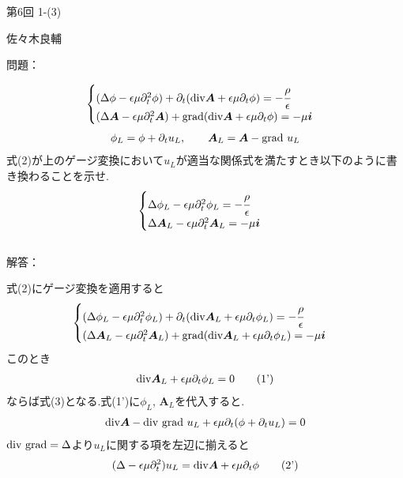 \documentclass[uplatex,a4j,11pt]{jsarticle}
\begin{document}
第6回 1-(3)
\begin{flushright}
  佐々木良輔
\end{flushright}
問題：\par
\setcounter{equation}{1}
\begin{align}
  \begin{cases}
    (\Delta\phi-\epsilon\mu\partial^2_t\phi)+\partial_t({\rm div}{\bm A}+\epsilon\mu\partial_t\phi)=-\cfrac{\rho}{\epsilon}\\
    (\Delta{\bm A}-\epsilon\mu\partial^2_t{\bm A})+{\rm grad}({\rm div}{\bm A}+\epsilon\mu\partial_t\phi)=-\mu{\bm i}
  \end{cases}
\end{align}
\begin{align*}
  \phi_L=\phi+\partial_t u_L,\qquad {\bm A}_L={\bm A}-{\rm grad}\ u_L
\end{align*}
式(2)が上のゲージ変換において$u_L$が適当な関係式を満たすとき以下のように書き換わることを示せ.
\begin{align}
  \begin{cases}
    \Delta\phi_L-\epsilon\mu\partial_t^2\phi_L=-\cfrac{\rho}{\epsilon}\\
    \Delta{\bm A}_L-\epsilon\mu\partial_t^2{\bm A}_L=-\mu{\bm i}
  \end{cases}
\end{align}\hrulefill\\
解答：\par
式(2)にゲージ変換を適用すると
\begin{align*}
  \begin{cases}
    (\Delta\phi_L-\epsilon\mu\partial^2_t\phi_L)+\partial_t({\rm div}{\bm A}_L+\epsilon\mu\partial_t\phi_L)=-\cfrac{\rho}{\epsilon}\\
    (\Delta{\bm A}_L-\epsilon\mu\partial^2_t{\bm A}_L)+{\rm grad}({\rm div}{\bm A}_L+\epsilon\mu\partial_t\phi_L)=-\mu{\bm i}
  \end{cases}
\end{align*}
このとき
\begin{align}
  {\rm div}{\bm A}_L+\epsilon\mu\partial_t\phi_L=0\tag{1'}
\end{align}
ならば式(3)となる.式(1')に$\phi_L$, ${\bm A}_L$を代入すると.
\begin{align*}
  {\rm div}{\bm A}-{\rm div\ grad}\ u_L+\epsilon\mu\partial_t(\phi+\partial_t u_L)=0
\end{align*}
${\rm div\ grad}=\Delta$より$u_L$に関する項を左辺に揃えると
\begin{align*}
  (\Delta-\epsilon\mu\partial_t^2)u_L={\rm div}{\bm A}+\epsilon\mu\partial_t\phi\tag{2'}
\end{align*}
\end{document}
